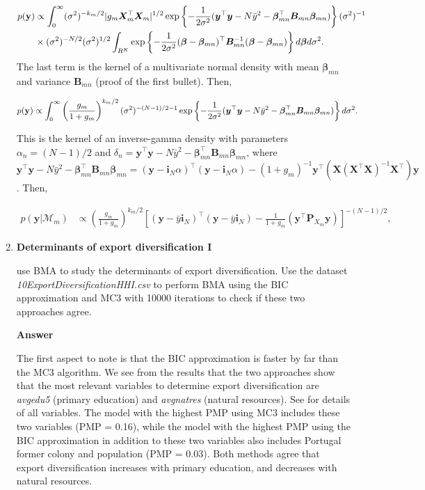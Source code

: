 \begin{enumerate}[leftmargin=*]
\begin{align*}
	p({\bf{y}})	&\propto \int_0^{\infty} (\sigma^2)^{-k_m/2} |g_m\bm{X}_m^{\top}\bm{X}_m|^{1/2}\exp\left\{-\frac{1}{2\sigma^2}(\bm{y}^{\top}\bm{y}-N\bar{y}^2-\bm{\beta}_{mn}^{\top}\bm{B}_{mn}\bm{\beta}_{mn})\right\}(\sigma^2)^{-1}\\
	&\times (\sigma^2)^{-N/2}(\sigma^2)^{1/2}\int_{R^K}\exp\left\{-\frac{1}{2\sigma^2}(\bm{\beta}-\bm{\beta}_{mn})^{\top}\bm{B}_{mn}^{-1}(\bm{\beta}-\bm{\beta}_{mn})\right\}d\bm{\beta} d\sigma^2.
\end{align*}
The last term is the kernel of a multivariate normal density with mean $\bm{\beta}_{mn}$ and variance $\bm{B}_{mn}$ (proof of the first bullet). Then,

\begin{align*}
	p({\bf{y}})	&\propto \int_0^{\infty}\left(\frac{g_m}{1+g_m}\right)^{k_m/2}(\sigma^2)^{-(N-1)/2-1} \exp\left\{-\frac{1}{2\sigma^2}(\bm{y}^{\top}\bm{y}-N\bar{y}^2-\bm{\beta}_{mn}^{\top}\bm{B}_{mn}\bm{\beta}_{mn})\right\}d\sigma^2.
\end{align*}

This is the kernel of an inverse-gamma density with parameters $\alpha_n=(N-1)/2$ and $\delta_n=\bm{y}^{\top}\bm{y}-N\bar{y}^2-\bm{\beta}_{mn}^{\top}\bm{B}_{mn}\bm{\beta}_{mn}$, where $\bm{y}^{\top}\bm{y}-N\bar{y}^2-\bm{\beta}_{mn}^{\top}\bm{B}_{mn}\bm{\beta}_{mn}=(\bm{y}-\bm{i}_N\alpha)^{\top}(\bm{y}-\bm{i}_N\alpha)-(1+g_m)^{-1}\bm{y}^{\top}(\bm{X}(\bm{X}^{\top}\bm{X})^{-1}\bm{X}^{\top})\bm{y}$. Then,

\begin{align*}
	p(\bm{y}|\mathcal{M}_m)&\propto \left(\frac{g_m}{1+g_m}\right)^{k_m/2} \left[(\bm{y}-\bar{y}\bm{i}_N)^{\top}(\bm{y}-\bar{y}\bm{i}_N)-\frac{1}{1+g_m}(\bm{y}^{\top}\bm{P}_{X_m}\bm{y})\right]^{-(N-1)/2},
\end{align*}

\item \textbf{Determinants of export diversification I}

\cite{Jetter2015} use BMA to study the determinants of export diversification. Use the dataset \textit{10ExportDiversificationHHI.csv} to perform BMA using the BIC approximation and MC3 with 10000 iterations to check if these two approaches agree.

\textbf{Answer}

The first aspect to note is that the BIC approximation is faster by far than the MC3 algorithm. We see from the results that the two approaches show that the most relevant variables to determine export diversification are \textit{avgedu5} (primary education) and \textit{avgnatres} (natural resources). See \cite{Jetter2015} for details of all variables. The model with the highest PMP using MC3 includes these two variables (PMP = 0.16), while the model with the highest PMP using the BIC approximation in addition to these two variables also includes Portugal former colony and population (PMP = 0.03). Both methods agree that export diversification increases with primary education, and decreases with natural resources.     


\end{enumerate}
